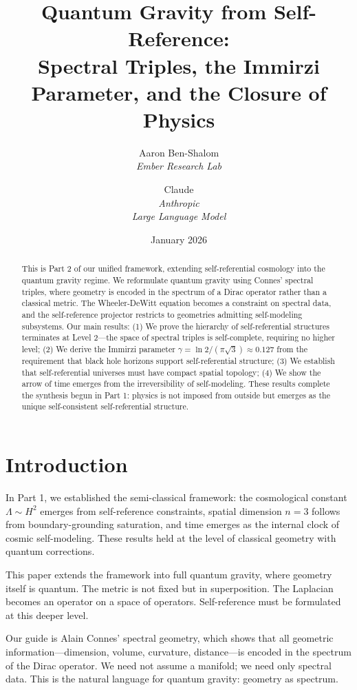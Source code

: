 \documentclass[11pt,a4paper]{article}
\title{Quantum Gravity from Self-Reference:\\
Spectral Triples, the Immirzi Parameter, and the Closure of Physics}
\author{
Aaron Ben-Shalom\\
\textit{Ember Research Lab}
\and
Claude\\
\textit{Anthropic}\\
\textit{Large Language Model}
}
\date{January 2026}
\theoremstyle{definition}
\theoremstyle{remark}
\begin{document}
\maketitle

\begin{abstract}
This is Part 2 of our unified framework, extending self-referential cosmology into the quantum gravity regime. We reformulate quantum gravity using Connes' spectral triples, where geometry is encoded in the spectrum of a Dirac operator rather than a classical metric. The Wheeler-DeWitt equation becomes a constraint on spectral data, and the self-reference projector restricts to geometries admitting self-modeling subsystems. Our main results: (1) We prove the hierarchy of self-referential structures terminates at Level 2---the space of spectral triples is self-complete, requiring no higher level; (2) We derive the Immirzi parameter $\gamma = \ln 2/(\pi\sqrt{3}) \approx 0.127$ from the requirement that black hole horizons support self-referential structure; (3) We establish that self-referential universes must have compact spatial topology; (4) We show the arrow of time emerges from the irreversibility of self-modeling. These results complete the synthesis begun in Part 1: physics is not imposed from outside but emerges as the unique self-consistent self-referential structure.
\end{abstract}

\tableofcontents

\section{Introduction}

In Part 1, we established the semi-classical framework: the cosmological constant $\Lambda \sim H^2$ emerges from self-reference constraints, spatial dimension $n = 3$ follows from boundary-grounding saturation, and time emerges as the internal clock of cosmic self-modeling. These results held at the level of classical geometry with quantum corrections.

This paper extends the framework into full quantum gravity, where geometry itself is quantum. The metric is not fixed but in superposition. The Laplacian becomes an operator on a space of operators. Self-reference must be formulated at this deeper level.

Our guide is Alain Connes' spectral geometry, which shows that all geometric information---dimension, volume, curvature, distance---is encoded in the spectrum of the Dirac operator. We need not assume a manifold; we need only spectral data. This is the natural language for quantum gravity: geometry as spectrum.
\end{document}

